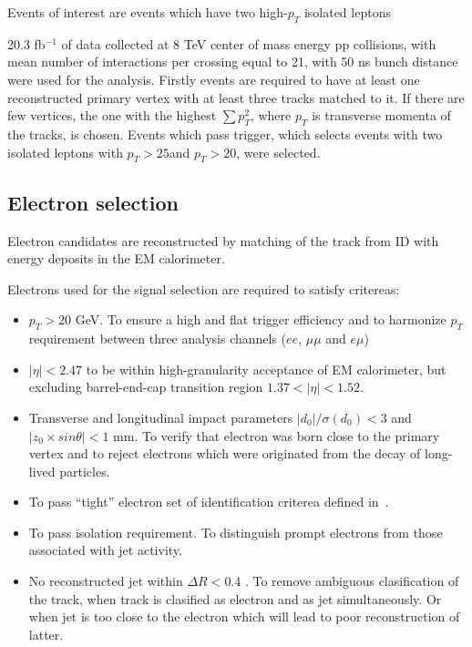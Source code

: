 Events of interest are events which have two high-$p_T$ isolated leptons \toFix

20.3 fb$^{-1}$ of data collected at 8 TeV center of mass energy pp collisions, with mean number of interactions per crossing equal to 21, 
with 50 ns bunch distance were used for the analysis.
Firstly events are required to have at least one reconstructed primary vertex with at least three tracks matched to it. If there are few vertices, the one with the highest
$\sum p^2_T$, where $p_T$ is transverse momenta of the tracks, is chosen.
Events which pass \toFix trigger, which selects events with two isolated \toFix leptons with $p_{T}>25$\toFix and $p_{T}>20$\toFix, were selected.

\subsection{Electron selection}
\label{subsec:electron_selection}

Electron candidates are reconstructed by matching of the track from ID with energy deposits in the EM calorimeter.


Electrons used for the signal selection are required to satisfy critereas:
\begin{itemize}
 \item $p_T > 20$ GeV. To ensure a high and flat trigger efficiency and to harmonize $p_T$ requirement between three analysis channels ($ee$, $\mu\mu$ and $e\mu$) 
 \item $|\eta|<2.47$ to be within high-granularity acceptance of EM calorimeter, but excluding barrel-end-cap transition region $1.37<|\eta|<1.52$.
 \item Transverse and longitudinal impact parameters $|d_0|/\sigma(d_0) < 3$ and $|z_0 \times sin \theta| < 1$ mm. 
 To verify that electron was born close to the primary vertex and to reject electrons which were originated from the decay of long-lived particles.
 \item To pass ``tight'' electron set of identification criterea defined in~\cite{electron_tight}. \\ 
 \item To pass isolation requirement. To distinguish prompt electrons from those associated with jet activity.
 \item No reconstructed jet within $\Delta R < 0.4$ \toFix[define R]. To remove ambiguous clasification of the track, when track is clasified as electron and as jet simultaneously. 
 Or when jet is too close to the electron which will lead to poor reconstruction of latter. 
\end{itemize}

